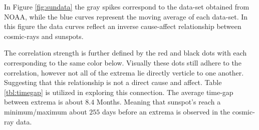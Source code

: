 
In Figure \ref{fig:sundata} the gray spikes correspond to the data-set obtained
from NOAA, while the blue curves represent the moving average of each data-set.
In this figure the data curves reflect an inverse cause-affect relationship between
cosmic-rays and sunspots.\\

\par The correlation strength is further defined by the red and black
dots with each corresponding to the same color below.
Visually these dots still adhere to the correlation, however not all of
the extrema lie directly verticle to one another. Suggesting that this 
relationship is not a direct cause and affect. Table \ref{tbl:timegap} is 
utilized in exploring this connection. The average time-gap between extrema
is about $8.4$ Months. Meaning that sunspot's reach a minimum/maximum about
$255$ days before an extrema is observed in the cosmic-ray data.
